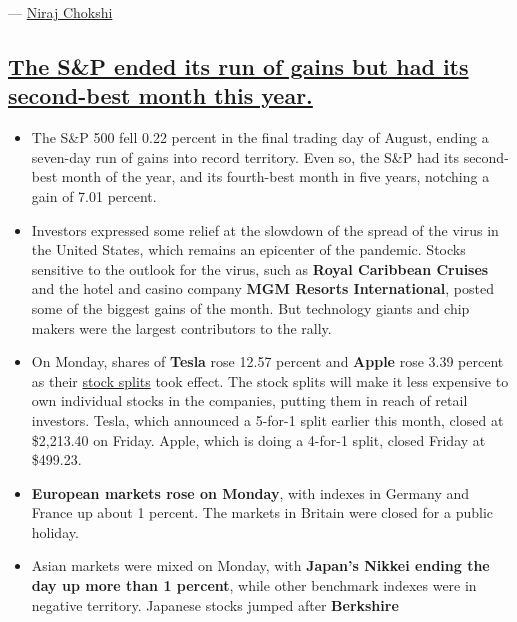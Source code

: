 --- \href{https://www.nytimes3xbfgragh.onion/by/niraj-chokshi}{Niraj
Chokshi}

\hypertarget{the-sp-ended-its-run-of-gains-but-had-its-second-best-month-this-year}{%
\subsection{\texorpdfstring{\protect\hyperlink{the-sp-ended-its-run-of-gains-but-had-its-second-best-month-this-year}{The
S\&P ended its run of gains but had its second-best month this
year.}}{The S\&P ended its run of gains but had its second-best month this year.}}\label{the-sp-ended-its-run-of-gains-but-had-its-second-best-month-this-year}}

\begin{itemize}
\item
  The S\&P 500 fell 0.22 percent in the final trading day of August,
  ending a seven-day run of gains into record territory. Even so, the
  S\&P had its second-best month of the year, and its fourth-best month
  in five years, notching a gain of 7.01 percent.
\item
  Investors expressed some relief at the slowdown of the spread of the
  virus in the United States, which remains an epicenter of the
  pandemic. Stocks sensitive to the outlook for the virus, such as
  \textbf{Royal Caribbean Cruises} and the hotel and casino company
  \textbf{MGM Resorts International}, posted some of the biggest gains
  of the month. But technology giants and chip makers were the largest
  contributors to the rally.
\item
  On Monday, shares of \textbf{Tesla} rose 12.57 percent and
  \textbf{Apple} rose 3.39 percent as their
  \href{https://www.nytimes3xbfgragh.onion/reuters/2020/08/28/business/apple-tesla-stocksplit.html}{stock
  splits} took effect. The stock splits will make it less expensive to
  own individual stocks in the companies, putting them in reach of
  retail investors. Tesla, which announced a 5-for-1 split earlier this
  month, closed at \$2,213.40 on Friday. Apple, which is doing a 4-for-1
  split, closed Friday at \$499.23.
\item
  \textbf{European markets rose on Monday}, with indexes in Germany and
  France up about 1 percent. The markets in Britain were closed for a
  public holiday.
\item
  Asian markets were mixed on Monday, with \textbf{Japan's Nikkei ending
  the day up more than 1 percent}, while other benchmark indexes were in
  negative territory. Japanese stocks jumped after \textbf{Berkshire
}
\end{itemize}
